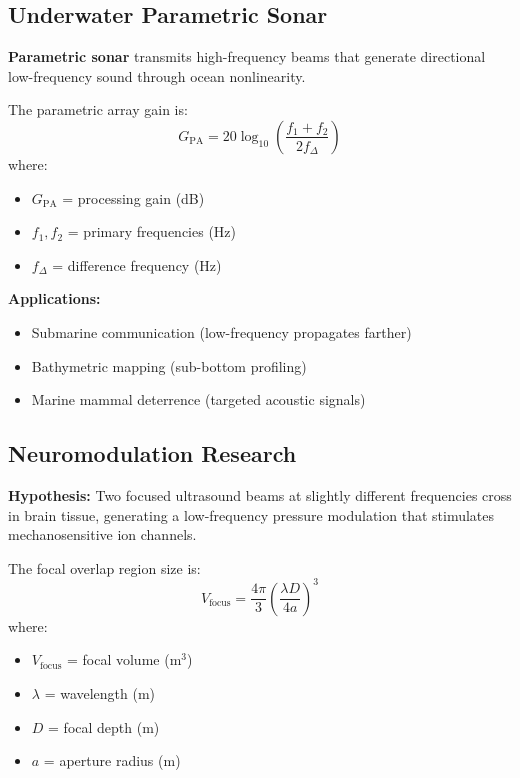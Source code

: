 \subsection{Underwater Parametric Sonar}

\textbf{Parametric sonar} transmits high-frequency beams that generate direc\-tion\-al low-frequency sound through ocean nonlinearity.

The parametric array gain is:
\begin{equation}
G_{\text{PA}} = 20\log_{10}\left(\frac{f_1 + f_2}{2f_\Delta}\right)
\end{equation}
where:
\begin{itemize}
\item $G_{\text{PA}}$ = processing gain (dB)
\item $f_1, f_2$ = primary frequencies (Hz)
\item $f_\Delta$ = difference frequency (Hz)
\end{itemize}

\textbf{Applications:}
\begin{itemize}
\item Submarine communication (low-frequency propagates farther)
\item Bathymetric mapping (sub-bottom profiling)
\item Marine mammal deterrence (targeted acoustic signals)
\end{itemize}

\subsection{Neuromodulation Research}

\textbf{Hypothesis:} Two focused ultrasound beams at slightly different frequencies cross in brain tissue, generating a low-frequency pressure modulation that stimulates mechanosensitive ion channels.

The focal overlap region size is:
\begin{equation}
V_{\text{focus}} = \frac{4\pi}{3}\left(\frac{\lambda D}{4a}\right)^3
\end{equation}
where:
\begin{itemize}
\item $V_{\text{focus}}$ = focal volume (m$^3$)
\item $\lambda$ = wavelength (m)
\item $D$ = focal depth (m)
\item $a$ = aperture radius (m)
\end{itemize}

